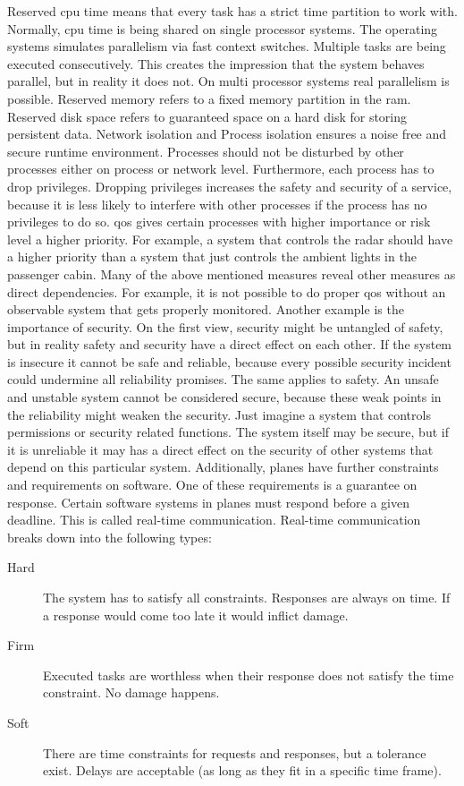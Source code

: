 \documentclass[titlepage]{report}
\begin{document}
Reserved \gls{cpu} time means that every task has a strict time partition to work with.
Normally, \gls{cpu} time is being shared on single processor systems. The operating systems simulates
parallelism via fast context switches. Multiple tasks are being executed consecutively. 
This creates the impression that the system behaves parallel, but in reality it does not.
On multi processor systems real parallelism is possible. Reserved memory refers to a fixed memory
partition in the \gls{ram}. Reserved disk space refers to guaranteed space on a hard disk for storing
persistent data. Network isolation and Process isolation ensures a noise free and secure runtime environment.
Processes should not be disturbed by other processes either on process or network level. Furthermore,
each process has to drop privileges. Dropping privileges increases the safety and security of a service,
because it is less likely to interfere with other processes if the process has no privileges to do so.
\gls{qos} gives certain processes with higher importance or risk level a higher priority. For example,
a system that controls the radar should have a higher priority than a system that just controls
the ambient lights in the passenger cabin.
Many of the above mentioned measures reveal other measures as direct dependencies. For example,
it is not possible to do proper \gls{qos} without an observable system that gets properly monitored.
Another example is the importance of security. On the first view, security might be untangled of safety,
but in reality safety and security have a direct effect on each other. If the system is insecure it cannot
be safe and reliable, because every possible security incident could undermine all reliability promises.
The same applies to safety. An unsafe and unstable system cannot be considered secure, because these
weak points in the reliability might weaken the security. Just imagine a system that controls
permissions or security related functions. The system itself may be secure, but if it is unreliable 
it may has a direct effect on the security of other systems that depend on this particular system.
Additionally, planes have further constraints and requirements on software. One of these requirements
is a guarantee on response. Certain software systems in planes must respond before a given deadline.
This is called real-time communication. Real-time communication breaks down into the following types\cite{worn2006echtzeitsysteme}:

\begin{description}
    \item[Hard] The system has to satisfy all constraints. Responses are always on time. If a response would come too late it would inflict damage.
    \item[Firm] Executed tasks are worthless when their response does not satisfy the time constraint. No damage happens.
    \item[Soft] There are time constraints for requests and responses, but a tolerance exist. Delays are acceptable (as long as they fit in a specific time frame).
\end{description}
\end{document}
